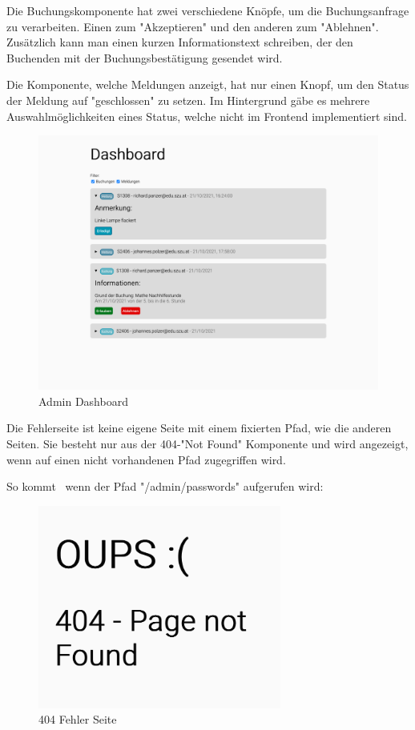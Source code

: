 Die Buchungskomponente hat zwei verschiedene Knöpfe, um die Buchungsanfrage zu verarbeiten. Einen zum "Akzeptieren" und den anderen zum "Ablehnen". Zusätzlich kann man einen kurzen Informationstext schreiben, der den Buchenden mit der Buchungsbestätigung gesendet wird. 

Die Komponente, welche Meldungen anzeigt, hat nur einen Knopf, um den Status der Meldung auf "geschlossen" zu setzen. Im Hintergrund gäbe es mehrere Auswahlmöglichkeiten eines Status, welche nicht im Frontend implementiert sind.

\begin{figure}[H]
    \centering
    \includegraphics[width=120mm]{media/WebComponents/AdminSeite_light.png}
    \caption{Admin Dashboard}
    \label{fig:admindashboard}
\end{figure}

\begin{minipage}{\textwidth}
    Die Fehlerseite ist keine eigene Seite mit einem fixierten Pfad, wie die anderen Seiten. Sie besteht nur aus der 404-"Not Found" Komponente und wird angezeigt, wenn auf einen nicht vorhandenen Pfad zugegriffen wird. 
\end{minipage}

So kommt \zb\ wenn der Pfad "{\ttfamily /admin/passwords}" aufgerufen wird:
    
\begin{figure}[H]
    \centering
    \includegraphics[width=80mm]{media/WebComponents/404.png}
    \caption{404 Fehler Seite}
\end{figure}
